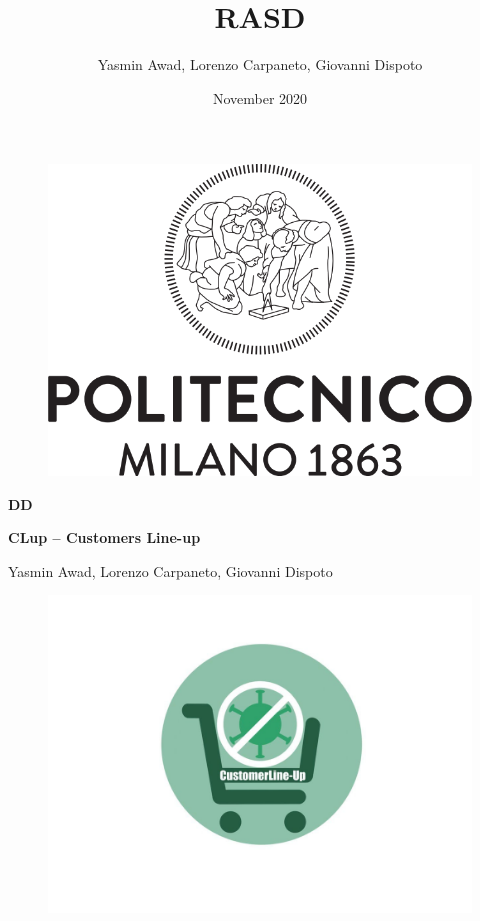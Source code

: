 \documentclass[a4paper, 12pt, oneside, table]{article}
\title{RASD}
\author{Yasmin Awad, Lorenzo Carpaneto, Giovanni Dispoto}
\date{November 2020}
\begin{document}
\begin{titlepage}
\begin{figure}[h!]
    \centering
    \includegraphics[scale=0.5]{img/logopoli.png}
\end{figure}
\vspace{0.7em}
\begin{center}
    \Large \textbf{DD}
\end{center}
\begin{center}
    \Large \textbf{CLup – Customers Line-up } 
\end{center}
\vspace{-0.6em}
\begin{center}
    \normalsize Yasmin Awad, Lorenzo Carpaneto, Giovanni Dispoto
    \begin{figure}[h!]
    \centering
    \includegraphics[scale=0.25]{img/logo.jpg}
\end{figure}
\end{center}
\vspace*{\fill}
\end{titlepage}
\end{document}
